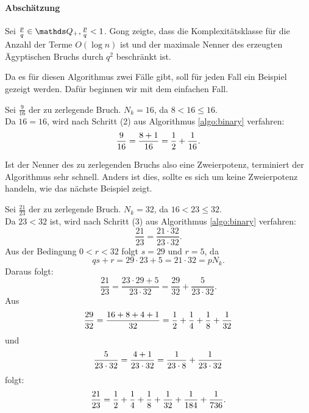 \paragraph{Abschätzung}Sei $\frac{p}{q} \in \Q_+, \frac{p}{q} < 1$. Gong zeigte, dass die Komplexitätsklasse für die Anzahl der Terme $O(\log n)$ ist und der maximale Nenner des erzeugten Ägyptischen Bruchs durch $q^2$ beschränkt ist. \cite[S. 12]{Gong1992}

Da es für diesen Algorithmus zwei Fälle gibt, soll für jeden Fall ein Beispiel gezeigt werden. Dafür beginnen wir mit dem einfachen Fall.

\begin{bsp}
	Sei $\frac{9}{16}$ der zu zerlegende Bruch. $N_k = 16$, da $8<16\leq16$.\\
	Da $16 = 16$, wird nach Schritt (2) aus Algorithmus \ref{algo:binary} verfahren:
	$$\frac{9}{16} = \frac{8+1}{16} = \frac{1}{2}+\frac{1}{16}.$$
\end{bsp}
Ist der Nenner des zu zerlegenden Bruchs also eine Zweierpotenz, terminiert der Algorithmus sehr schnell. Anders ist dies, sollte es sich um keine Zweierpotenz handeln, wie das nächste Beispiel zeigt.
\begin{bsp}
	Sei $\frac{21}{23}$ der zu zerlegende Bruch. $N_k = 32$, da $16 < 23 \leq 32$.\\
	Da $23<32$ ist, wird nach Schritt (3) aus Algorithmus \ref{algo:binary} verfahren:
	$$\frac{21}{23} = \frac{21 \cdot 32}{23 \cdot 32}.$$
	Aus der Bedingung $0<r<32$ folgt $s = 29$ und $r = 5$, da $$qs+r = 29 \cdot 23 + 5 = 21 \cdot 32 = p N_k.$$
	Daraus folgt:
	$$\frac{21}{23} = \frac{23 \cdot 29+5}{23 \cdot 32} = \frac{29}{32} + \frac{5}{23 \cdot 32}.$$
	Aus $$\frac{29}{32} = \frac{16+8+4+1}{32} = \frac{1}{2} + \frac{1}{4} + \frac{1}{8} + \frac{1}{32}$$ und $$\frac{5}{23 \cdot 32} = \frac{4+1}{23 \cdot 32} = \frac{1}{23 \cdot 8} + \frac{1}{23 \cdot 32}$$ folgt:
	$$\frac{21}{23} = \frac{1}{2} + \frac{1}{4} + \frac{1}{8} + \frac{1}{32} + \frac{1}{184} + \frac{1}{736}.$$
\end{bsp}